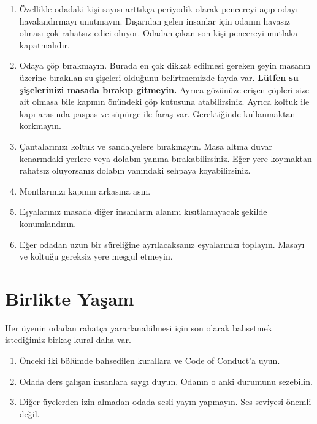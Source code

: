 \documentclass{article}
\begin{document}
\begin{enumerate}
	\item Özellikle odadaki kişi sayısı arttıkça periyodik olarak pencereyi açıp odayı havalandırmayı unutmayın. Dışarıdan gelen insanlar için odanın havasız olması çok rahatsız edici oluyor. Odadan çıkan son kişi pencereyi mutlaka kapatmalıdır.
	\item Odaya çöp bırakmayın. Burada en çok dikkat edilmesi gereken şeyin masanın üzerine bırakılan su şişeleri olduğunu belirtmemizde fayda var. \textbf{Lütfen su şişelerinizi masada bırakıp gitmeyin.} Ayrıca gözünüze erişen çöpleri size ait olmasa bile kapının önündeki çöp kutusuna atabilirsiniz. Ayrıca koltuk ile kapı arasında paspas ve süpürge ile faraş var. Gerektiğinde kullanmaktan korkmayın.
	\item Çantalarınızı koltuk ve sandalyelere bırakmayın. Masa altına duvar kenarındaki yerlere veya dolabın yanına bırakabilirsiniz. Eğer yere koymaktan rahatsız oluyorsanız dolabın yanındaki sehpaya koyabilirsiniz.
	\item Montlarınızı kapının arkasına asın.
	\item Eşyalarınız masada diğer insanların alanını kısıtlamayacak şekilde konumlandırın.
	\item Eğer odadan uzun bir süreliğine ayrılacaksanız eşyalarınızı toplayın. Masayı ve koltuğu gereksiz yere meşgul etmeyin.
\end{enumerate}

\section{Birlikte Yaşam}
Her üyenin odadan rahatça yararlanabilmesi için son olarak bahsetmek istediğimiz birkaç kural daha var.
\begin{enumerate}
	\item Önceki iki bölümde bahsedilen kurallara ve Code of Conduct'a uyun.
	\item Odada ders çalışan insanlara saygı duyun. Odanın o anki durumunu sezebilin.
	\item Diğer üyelerden izin almadan odada sesli yayın yapmayın. Ses seviyesi önemli değil.
\end{enumerate}
	
\end{document}
